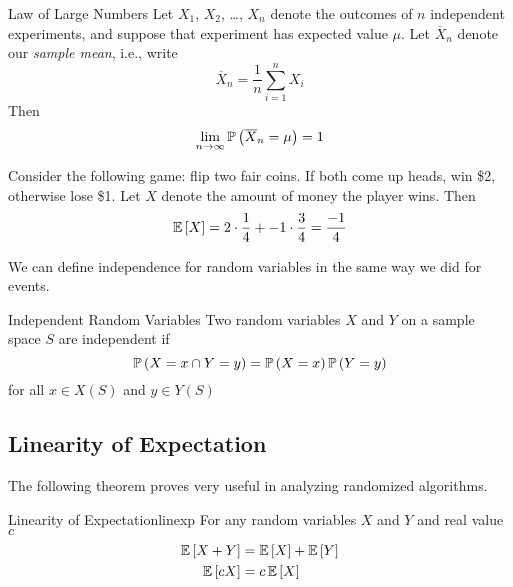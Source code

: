 \begin{theorem}{Law of Large Numbers}{}
    Let $X_1$, $X_2$, \dots, $X_n$ denote the outcomes of $n$ independent
    experiments, and suppose that experiment has expected value $\mu$. Let
    $\overline{X}_n$ denote our \emph{sample mean}, i.e., write
    \[\overline{X}_n = \frac{1}{n}\sum_{i=1}^nX_i\]
    Then
    \[\lim_{n \to \infty}\operatorname{\mathbb{P}}\left(\overline{X}_n = \mu\right) = 1\]
\end{theorem}

Consider the following game: flip two fair coins. If both come up heads, win
\$2, otherwise lose \$1. Let $X$ denote the amount of money the player wins.
Then
\[\operatorname{\mathbb{E}}\left[X\right] = 2 \cdot \frac{1}{4} + -1\cdot\frac{3}{4} = \frac{-1}{4}\]

We can define independence for random variables in the same way we did for
events.
\begin{definition}{Independent Random Variables}{}
    Two random variables $X$ and $Y$ on a sample space $S$ are independent if
    \[\operatorname{\mathbb{P}}\left(X = x \cap Y = y\right) = \operatorname{\mathbb{P}}\left(X = x\right)\operatorname{\mathbb{P}}\left(Y = y\right)\]
    for all $x \in X(S)$ and $y \in Y(S)$
\end{definition}

\subsection{Linearity of Expectation}
The following theorem proves very useful in analyzing randomized algorithms.
\begin{theorem}{Linearity of Expectation}{linexp}
    For any random variables $X$ and $Y$ and real value $c$
    \begin{align*}
        \operatorname{\mathbb{E}}\left[X + Y\right] &= \operatorname{\mathbb{E}}\left[X\right] + \operatorname{\mathbb{E}}\left[Y\right]\\
        \operatorname{\mathbb{E}}\left[cX\right] &= c\operatorname{\mathbb{E}}\left[X\right]
    \end{align*}
\end{theorem}

